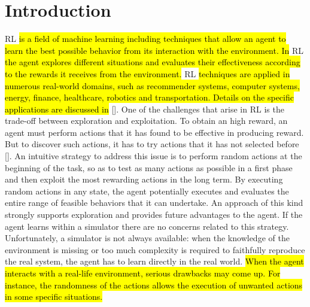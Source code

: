 \chapter{Introduction} \label{ch:intro}

\acf{RL} \hl{is a field of machine learning including techniques that allow an agent to learn the best possible behavior from its interaction with the environment. In} \ac{RL} \hl{the agent explores different situations and evaluates their effectiveness according to the rewards it receives from the environment.} \ac{RL} \hl{techniques are applied in numerous real-world domains, such as recommender systems, computer systems, energy, finance, healthcare, robotics and transportation. Details on the specific applications are discussed in} [\cite{yuxi2019}].
One of the challenges that arise in \ac{RL} is the trade-off between exploration and exploitation. To obtain an high reward, an agent must perform actions that it has found to be effective in producing reward. But to discover such actions, it has to try actions that it has not selected before [\cite{sutton2018reinforcement}]. An intuitive strategy to address this issue is to perform random actions at the beginning of the task, so as to test as many actions as possible in a first phase and then exploit the most rewarding actions in the long term. By executing random actions in any state, the agent potentially executes and evaluates the entire range of feasible behaviors that it can undertake. An approach of this kind strongly supports exploration and provides future advantages to the agent. If the agent learns within a simulator there are no concerns related to this strategy. Unfortunately, a simulator is not always available: when the knowledge of the environment is missing or too much complexity is required to faithfully reproduce the real system, the agent has to learn directly in the real world. \hl{When the agent interacts with a real-life environment, serious drawbacks may come up. For instance, the randomness of the actions allows the execution of unwanted actions in some specific situations.}\\
\newline
